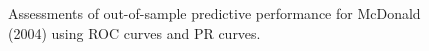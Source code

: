 \begin{figure}
\centering   
{}
\caption{\label{fig:mcdall} Assessments of out-of-sample predictive performance for McDonald (2004) using ROC curves and PR curves.}
\end{figure}


